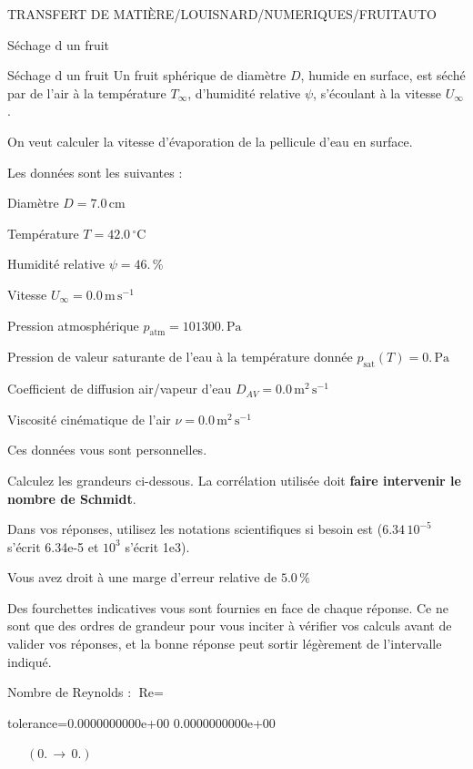 \documentclass[12pt]{article}
\begin{document}
\begin{quiz}{TRANSFERT DE MATIÈRE/LOUISNARD/NUMERIQUES/FRUITAUTO}
\begin{cloze}{Séchage d un fruit}
\end{cloze} 


 \begin{cloze}{Séchage d un fruit} 
Un fruit sphérique de diamètre $D$, humide en surface, est séché par de l'air à la température $T_\infty$, d'humidité relative $\psi$, s'écoulant à la vitesse $U_\infty$.

On veut calculer la vitesse d'évaporation de la pellicule d'eau en surface.

 

Les données sont les suivantes :

 

Diamètre $D = 7.0\,  \mathrm{cm} $

Température $T = 42.0\,  \mathrm{^\circ\mathrm{C}} $

Humidité relative $\psi = 46.\, \% $

Vitesse $U_\infty = 0.0\,  \mathrm{m}\,  \mathrm{s}^{-1} $

Pression atmosphérique $p_{\text{atm}} = 101300.\,  \mathrm{Pa} $

Pression de valeur saturante de l’eau à la température donnée $p_{\text{sat}}(T) = 0.\,  \mathrm{Pa} $

Coefficient de diffusion air/vapeur d’eau $D_{AV} = 0.0\,  \mathrm{m}^{2}\,  \mathrm{s}^{-1} $

Viscosité cinématique de l’air $\nu = 0.0\,  \mathrm{m}^{2}\,  \mathrm{s}^{-1} $

Ces données vous sont personnelles.

 

Calculez les grandeurs ci-dessous. La corrélation utilisée doit \textbf{faire intervenir le nombre de Schmidt}.

Dans vos réponses, utilisez les notations scientifiques si besoin est ($6.34\, 10^{-5}$ s'écrit 6.34e-5 et $10^{3}$ s'écrit 1e3).

Vous avez droit à une marge d'erreur relative de $5.0\, \% $

Des fourchettes indicatives vous sont fournies en face de chaque réponse. Ce ne sont que des ordres de grandeur pour vous inciter à vérifier vos calculs avant de valider vos réponses, et la bonne réponse peut sortir légèrement de l'intervalle indiqué.

 

Nombre de Reynolds : $\text{Re} =  $
\begin{numerical}[points=1] 
\item[tolerance={0.0000000000e+00}] 0.0000000000e+00 
\end{numerical} 
 $\,$ 
 $ \quad (0. \, \rightarrow \, 0.) $ 


\end{cloze}
\end{quiz}
\end{document}
